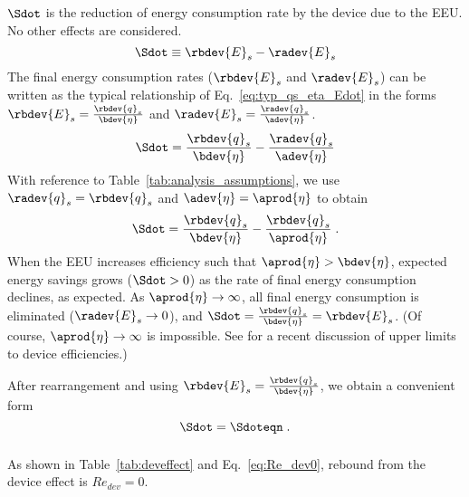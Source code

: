 $\Sdot$ is the reduction of energy consumption rate
by the device due to the EEU.
No other effects are considered.
%
\begin{equation}
  \Sdot \equiv \rbdev{E}_s - \radev{E}_s
\end{equation}
%
The final energy consumption rates ($\rbdev{E}_s$ and $\radev{E}_s$) 
can be written as the typical relationship of Eq.~\ref{eq:typ_qs_eta_Edot} in the forms
$\rbdev{E}_s = \frac{\rbdev{q}_s}{\bdev{\eta}}$ and 
$\radev{E}_s = \frac{\radev{q}_s}{\adev{\eta}}$. 
%
\begin{equation}
  \Sdot = \frac{\rbdev{q}_s}{\bdev{\eta}} - \frac{\radev{q}_s}{\adev{\eta}}
\end{equation}
%
With reference to Table~\ref{tab:analysis_assumptions}, 
we use $\radev{q}_s = \rbdev{q}_s$ and $\adev{\eta} = \aprod{\eta}$ to obtain
%
\begin{equation}
  \Sdot = \frac{\rbdev{q}_s}{\bdev{\eta}} - \frac{\rbdev{q}_s}{\aprod{\eta}} \; .
\end{equation}
%
When the EEU increases efficiency such that $\aprod{\eta} > \bdev{\eta}$,
expected energy savings grows ($\Sdot > 0$)
as the rate of final energy consumption declines,
as expected.
As $\aprod{\eta} \rightarrow \infty$,
all final energy consumption is eliminated ($\radev{E}_s \rightarrow 0$), and
$\Sdot = \frac{\rbdev{q}_s}{\bdev{\eta}} = \rbdev{E}_s$.
(Of course, $\aprod{\eta} \rightarrow \infty$ is impossible. 
See \citet{Paoli:2020aa} for a recent discussion of upper limits to device efficiencies.)

After rearrangement and using $\rbdev{E}_s = \frac{\rbdev{q}_s}{\bdev{\eta}}$, 
we obtain a convenient form
%
\begin{equation} \label{eq:Sdot}
  \Sdot = \Sdoteqn \; .
\end{equation}


\subsubsection{\Deveffect} 
\label{sec:Re_dev}

As shown in Table~\ref{tab:deveffect} and Eq.~\ref{eq:Re_dev0}, 
rebound from the device effect is $Re_{dev} = 0$.


\subsubsection{\Lceffect{}} 
\label{sec:Re_lc}

